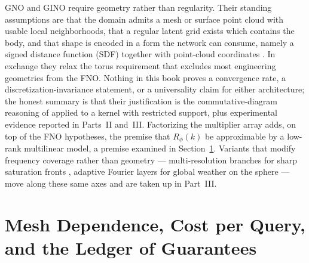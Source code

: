 GNO and GINO require geometry rather than regularity. Their standing assumptions are that the domain admits a mesh or surface point cloud with usable local neighborhoods, that a regular latent grid exists which contains the body, and that shape is encoded in a form the network can consume, namely a signed distance function (SDF) together with point-cloud coordinates \cite{li2023geometry}. In exchange they relax the torus requirement that excludes most engineering geometries from the FNO. Nothing in this book proves a convergence rate, a discretization-invariance statement, or a universality claim for either architecture; the honest summary is that their justification is the commutative-diagram reasoning of  applied to a kernel with restricted support, plus experimental evidence reported in Parts~II and~III.  Factorizing the multiplier array adds, on top of the FNO hypotheses, the premise that $R_\phi(k)$ be approximable by a low-rank multilinear model, a premise examined in Section~\ref{sec:ch8-cost}. Variants that modify frequency coverage rather than geometry --- multi-resolution branches for sharp saturation fronts \cite{wen2022ufno}, adaptive Fourier layers for global weather on the sphere \cite{guibas2021afno,pathak2022fourcastnet} --- move along these same axes and are taken up in Part~III.

\section{Mesh Dependence, Cost per Query, and the Ledger of Guarantees}
\label{sec:ch8-cost}

